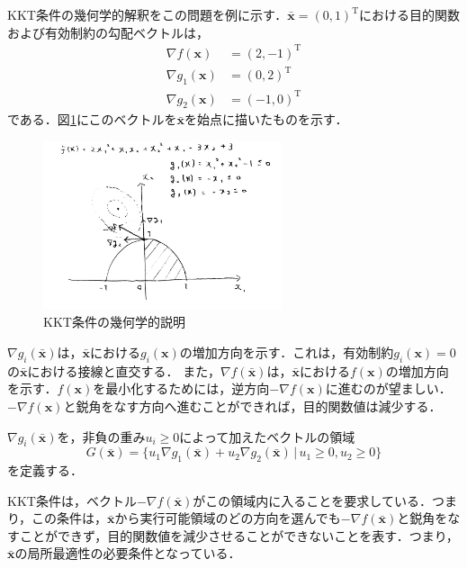 \documentclass{jsreport}
\begin{document}
KKT条件の幾何学的解釈をこの問題を例に示す．$\bar{\bm{x}} = (0, 1)^{\mathrm{T}}$における目的関数および有効制約の勾配ベクトルは，
\begin{align}
  \nabla f(\bm{x}) &= (2, -1)^{\mathrm{T}} \nonumber \\
  \nabla g_1(\bm{x}) &= (0, 2)^{\mathrm{T}} \nonumber \\
  \nabla g_2(\bm{x}) &= (-1, 0)^{\mathrm{T}} \nonumber
\end{align}
である．図\ref{fig:KKT}にこのベクトルを$\bar{\bm{x}}$を始点に描いたものを示す．
\begin{figure}[tb]
  \centering
  \includegraphics[clip, width=7cm]{../figure/KKT_2.pdf}
  \caption{KKT条件の幾何学的説明}
  \label{fig:KKT}
\end{figure}
$\nabla g_i(\bar{\bm{x}})$は，$\bar{\bm{x}}$における$g_i(\bm{x})$の増加方向を示す．これは，有効制約$g_i(\bm{x}) = 0$の$\bar{\bm{x}}$における接線と直交する．
また，$\nabla f(\bar{\bm{x}})$は，$\bar{\bm{x}}$における$f(\bm{x})$の増加方向を示す．$f(\bm{x})$を最小化するためには，逆方向$-\nabla f(\bm{x})$に進むのが望ましい．$-\nabla f(\bm{x})$と鋭角をなす方向へ進むことができれば，目的関数値は減少する．

$\nabla g_i(\bar{\bm{x}})$を，非負の重み$u_i \geq 0$によって加えたベクトルの領域
\begin{equation}
  G(\bar{\bm{x}}) = \{u_1 \nabla g_1(\bar{\bm{x}}) + u_2 \nabla g_2(\bar{\bm{x}}) \, | \, u_1 \geq 0, u_2 \geq 0\} \nonumber
\end{equation}
を定義する．

KKT条件は，ベクトル$-\nabla f(\bar{\bm{x}})$がこの領域内に入ることを要求している．つまり，この条件は，$\bar{\bm{x}}$から実行可能領域のどの方向を選んでも$-\nabla f(\bar{\bm{x}})$と鋭角をなすことができず，目的関数値を減少させることができないことを表す．つまり，$\bar{\bm{x}}$の局所最適性の必要条件となっている．
\end{document}
